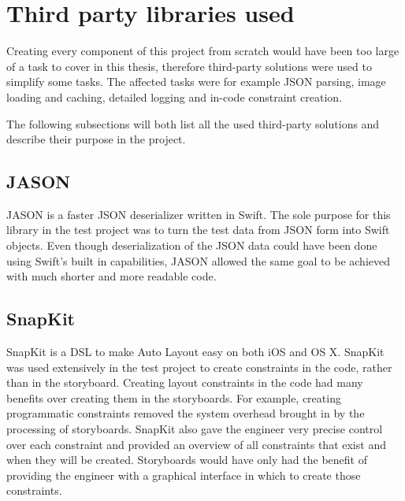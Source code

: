 \documentclass[a4paper,12pt]{article}
\begin{document}
\section{Third party libraries used}
Creating every component of this project from scratch would have been too large of a task to cover in this thesis, therefore third-party solutions were used to simplify some tasks. The affected tasks were for example JSON parsing, image loading and caching, detailed logging and in-code constraint creation.

The following subsections will both list all the used third-party solutions and describe their purpose in the project.

\subsection{JASON}
JASON is a faster JSON deserializer written in Swift.\cite{JASON} The sole purpose for this library in the test project was to turn the test data from JSON form into Swift objects. Even though deserialization of the JSON data could have been done using Swift's built in capabilities, JASON allowed the same goal to be achieved with much shorter and more readable code.

\subsection{SnapKit}
SnapKit is a DSL to make Auto Layout easy on both iOS and OS X.\cite{SnapKit} SnapKit was used extensively in the test project to create constraints in the code, rather than in the storyboard. Creating layout constraints in the code had many benefits over creating them in the storyboards. For example, creating programmatic constraints removed the system overhead brought in by the processing of storyboards. SnapKit also gave the engineer very precise control over each constraint and provided an overview of all constraints that exist and when they will be created. Storyboards would have only had the benefit of providing the engineer with a graphical interface in which to create those constraints.
\end{document}
